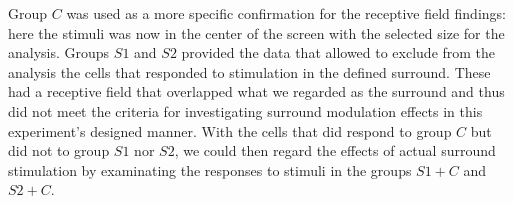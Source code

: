 Group $C$ was used as a more specific confirmation for the receptive field findings: here the stimuli was now in the center of the screen with the selected size for the analysis. Groups $S1$ and $S2$ provided the data that allowed to exclude from the analysis the cells that responded to stimulation in the defined surround. These had a receptive field that overlapped what we regarded as the surround and thus did not meet the criteria for investigating surround modulation effects in this experiment's designed manner. With the cells that did respond to group $C$ but did not to group $S1$ nor $S2$, we could then regard the effects of actual surround stimulation by examinating the responses to stimuli in the groups $S1+C$ and $S2+C$.